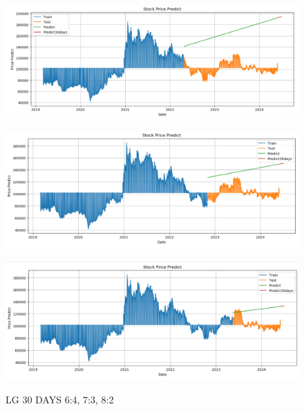 \documentclass{article}
\begin{document}
\begin{multicols}{2}
\begin{figure}[H]
    \centering
    \begin{minipage}{0.15\textwidth}
    \centering
    \includegraphics[width=1\textwidth]{Image/Linear/Linear_LG_6_4_30DAYS.png}
   
    \label{fig:1}
    \end{minipage}%
    \begin{minipage}{0.15\textwidth}
    \centering
    \includegraphics[width=1\textwidth]{Image/Linear/Linear_LG_7_3_30DAYS.png}
  
    \label{fig:2}
    \end{minipage}%
    \begin{minipage}{0.15\textwidth}
    \centering
    \includegraphics[width=1\textwidth]{Image/Linear/Linear_LG_8_2_30DAYS.png}

    \label{fig:3}
    \end{minipage}
    \caption{LG 30 DAYS  6:4, 7:3, 8:2 }
\end{figure}


\end{multicols}
\end{document}
